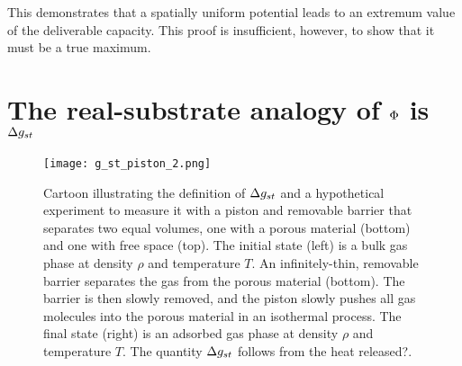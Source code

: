 This demonstrates that a spatially uniform potential leads to an extremum value of the deliverable capacity.  This proof is insufficient, however, to show that it must be a true maximum.

\section{The real-substrate analogy of $\Phi$ is $\Delta g_{st}$}
\label{sec:phi-is-delta-g}
\begin{figure}
    \centering
    \texttt{[image: g\_st\_piston\_2.png]}
    \caption{Cartoon illustrating the definition of $\Delta g_{st}$ and a hypothetical experiment to measure it with a piston and removable barrier that separates two equal volumes, one with a porous material (bottom) and one with free space (top). The initial state (left) is a bulk gas phase at density $\rho$ and temperature $T$. An infinitely-thin, removable barrier separates the gas from the porous material (bottom). The barrier is then slowly removed, and the piston slowly pushes all gas molecules into the porous material in an isothermal process. The final state (right) is an adsorbed gas phase at density $\rho$ and temperature $T$. The quantity $\Delta g_{st}$ follows from {\color{red} the heat released?}.}
    \label{fig:delta-G-cartoon}
\end{figure}

